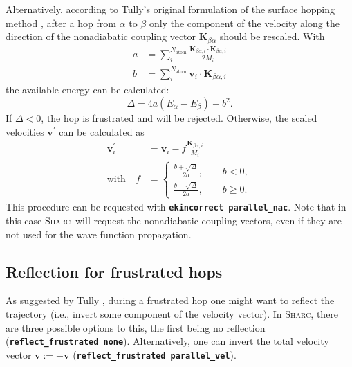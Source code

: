 \documentclass[a4paper,10pt,DIV=15,openany,twoside=false]{scrbook}
\newcommand{\sharc}{\textsc{Sharc}}
\newcommand{\ttt}[1]{\textbf{\texttt{#1}}}
\newcommand{\VEC}[1]{\ensuremath{\mathbf{#1}}}
\begin{document}
Alternatively, according to Tully's original formulation of the surface hopping method \cite{Tully1990JCP}, after a hop from $\alpha$ to $\beta$ only the component of the velocity along the direction of the nonadiabatic coupling vector $\VEC{K}_{\beta\alpha}$ should be rescaled. With
\begin{align}
  a&=\sum\limits_i^{N_\mathrm{atom}} \frac{\VEC{K}_{\beta\alpha, i}\cdot\VEC{K}_{\beta\alpha, i}}{2M_i}\\
  b&=\sum\limits_i^{N_\mathrm{atom}} \VEC{v}_{i}\cdot\VEC{K}_{\beta\alpha, i}
\end{align}
the available energy can be calculated:
\begin{equation}
  \Delta=
  4a
  \left(
    E_\alpha-E_\beta
  \right)+b^2.
\end{equation}
If $\Delta<0$, the hop is frustrated and will be rejected. Otherwise, the scaled velocities $\VEC{v}^\prime$ can be calculated as
\begin{align}
  \VEC{v}_i^\prime&=\VEC{v}_i-f\frac{\VEC{K}_{\beta\alpha, i}}{M_i}\\
  \mathrm{with}\quad f&=
  \begin{cases}
    \frac{b+\sqrt{\Delta}}{2a},\qquad b<0,\\
    \frac{b-\sqrt{\Delta}}{2a},\qquad b\geq 0.
  \end{cases}
\end{align}
This procedure can be requested with \ttt{ekincorrect parallel\_nac}. Note that in this case \sharc\ will request the nonadiabatic coupling vectors, even if they are not used for the wave function propagation.

\subsection{Reflection for frustrated hops}\label{met:refl_frust}

As suggested by Tully \cite{Tully1990JCP}, during a frustrated hop one might want to reflect the trajectory (i.e., invert some component of the velocity vector).
In \sharc, there are three possible options to this, the first being no reflection (\ttt{reflect\_frustrated none}).
Alternatively, one can invert the total velocity vector $\VEC{v}:=-\VEC{v}$ (\ttt{reflect\_frustrated parallel\_vel}).
\end{document}
